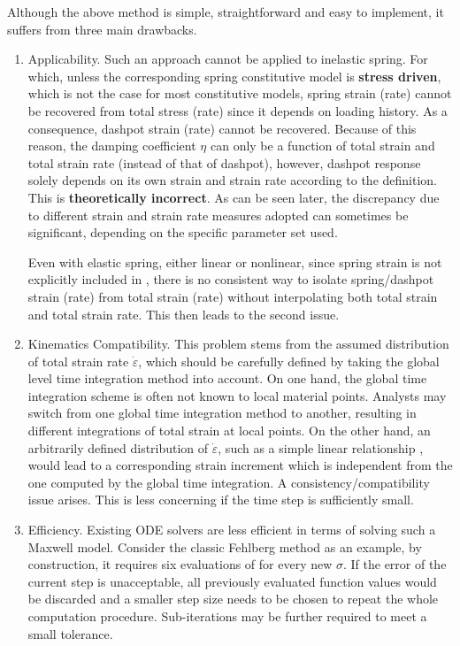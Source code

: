 Although the above method is simple, straightforward and easy to implement, it suffers from three main drawbacks.
\begin{enumerate}
\item
Applicability. Such an approach cannot be applied to inelastic spring. For which, unless the corresponding spring constitutive model is \textbf{stress driven}, which is not the case for most constitutive models, spring strain (rate) cannot be recovered from total stress (rate) since it depends on loading history. As a consequence, dashpot strain (rate) cannot be recovered. Because of this reason, the damping coefficient $\eta$ can only be a function of total strain and total strain rate (instead of that of dashpot), however, dashpot response solely depends on its own strain and strain rate according to the definition. This is \textbf{theoretically incorrect}. As can be seen later, the discrepancy due to different strain and strain rate measures adopted can sometimes be significant, depending on the specific parameter set used.

Even with elastic spring, either linear or nonlinear, since spring strain is not explicitly included in , there is no consistent way to isolate spring/dashpot strain (rate) from total strain (rate) without interpolating both total strain and total strain rate. This then leads to the second issue.
\item
Kinematics Compatibility. This problem stems from the assumed distribution of total strain rate $\dot\varepsilon$, which should be carefully defined by taking the global level time integration method into account. On one hand, the global time integration scheme is often not known to local material points. Analysts may switch from one global time integration method to another, resulting in different integrations of total strain at local points. On the other hand, an arbitrarily defined distribution of $\dot\varepsilon$, such as a simple linear relationship \citep{Akcelyan2018}, would lead to a corresponding strain increment which is independent from the one computed by the global time integration. A consistency/compatibility issue arises. This is less concerning if the time step is sufficiently small.
\item
Efficiency. Existing ODE solvers are less efficient in terms of solving such a Maxwell model. Consider the classic Fehlberg method \citep{Fehlberg1969} as an example, by construction, it requires six evaluations of  for every new $\sigma$. If the error of the current step is unacceptable, all previously evaluated function values would be discarded and a smaller step size needs to be chosen to repeat the whole computation procedure. Sub-iterations may be further required to meet a small tolerance.


\end{enumerate}
